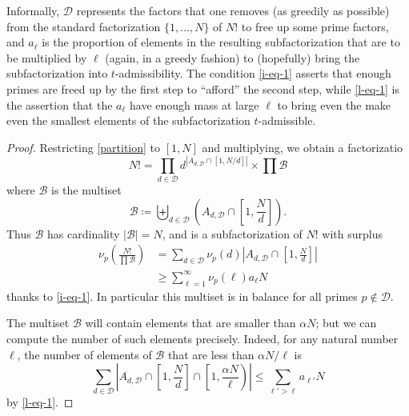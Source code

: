 \documentclass[12pt,a4paper,reqno]{amsart}
\numberwithin{equation}{section}
\theoremstyle{plain}
\theoremstyle{definition}
\newcommand\tuple{{\mathcal B}}
\begin{document}
  Informally, ${\mathcal D}$ represents the factors that one removes (as greedily as possible) from the standard factorization $\{1,\dots,N\}$ of $N!$ to free up some prime factors, and $a_\ell$ is the proportion of elements in the resulting subfactorization that are to be multiplied by $\ell$ (again, in a greedy fashion) to (hopefully) bring the subfactorization into $t$-admissibility.  The condition \eqref{i-eq-1} asserts that enough primes are freed up by the first step to ``afford'' the second step, while \eqref{l-eq-1} is the assertion that the $a_\ell$ have enough mass at large $\ell$ to bring even the make even the smallest elements of the subfactorization $t$-admissible.

  \begin{proof}  Restricting \eqref{partition} to $[1,N]$ and multiplying, we obtain a factorizatio
  $$ N! = \prod_{d \in {\mathcal D}} d^{|A_{d,{\mathcal D}} \cap [1,N/d]|} \times \prod \tuple$$
  where $\tuple$ is the multiset
  $$ \tuple \coloneqq \biguplus_{d \in {\mathcal D}} \left(A_{d,{\mathcal D}} \cap \left[1,\frac{N}{d}\right]\right).$$
  Thus $\tuple$ has cardinality $|\tuple| = N$, and is a subfactorization of $N!$ with surplus
  \begin{equation}\label{p-surplus-1}
  \begin{split}
   \nu_p\left( \frac{N!}{\prod \tuple} \right) &= \sum_{d \in {\mathcal D}} \nu_p(d) \left|A_{d,{\mathcal D}} \cap \left[1,\frac{N}{d}\right]\right| \\
   &\geq      \sum_{\ell=1}^\infty \nu_p(\ell) a_\ell N
  \end{split}
  \end{equation}
  thanks to \eqref{i-eq-1}.  In particular this multiset is in balance for all primes $p \not \in {\mathcal D}$. 
  
  The multiset $\tuple$ will contain elements that are smaller than $\alpha N$; but we can compute the number of such elements  precisely.  Indeed, for any natural number $\ell$, the number of elements of $\tuple$ that are less than $\alpha N/\ell$ is
  \begin{equation}\label{N-sum-1}
    \sum_{d \in {\mathcal D}} \left|A_{d,{\mathcal D}} \cap \left[1,\frac{N}{d}\right] \cap \left[1,\frac{\alpha N}{\ell}\right)\right| 
    \leq  \sum_{\ell' > \ell} a_{\ell'} N
  \end{equation}
  by \eqref{l-eq-1}.
    

\end{proof}
\end{document}
